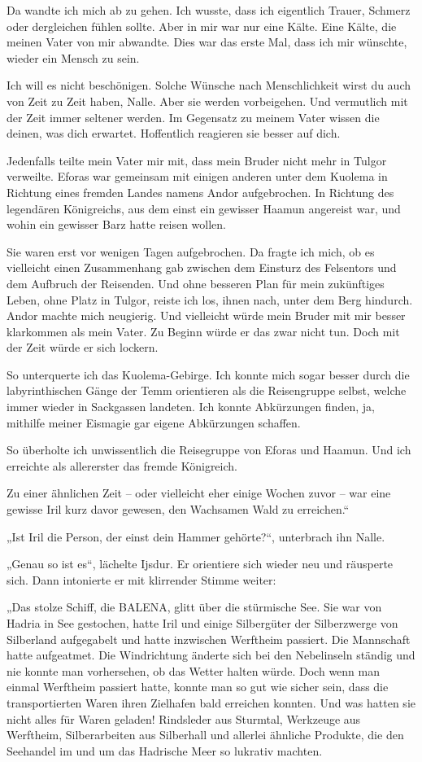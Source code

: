Da wandte ich mich ab zu gehen. Ich wusste, dass ich eigentlich Trauer, Schmerz oder dergleichen fühlen sollte. Aber in mir war nur eine Kälte. Eine Kälte, die meinen Vater von mir abwandte. Dies war das erste Mal, dass ich mir wünschte, wieder ein Mensch zu sein.

Ich will es nicht beschönigen. Solche Wünsche nach Menschlichkeit wirst du auch von Zeit zu Zeit haben, Nalle. Aber sie werden vorbeigehen. Und vermutlich mit der Zeit immer seltener werden. Im Gegensatz zu meinem Vater wissen die deinen, was dich erwartet. Hoffentlich reagieren sie besser auf dich.

Jedenfalls teilte mein Vater mir mit, dass mein Bruder nicht mehr in Tulgor verweilte. Eforas war gemeinsam mit einigen anderen unter dem Kuolema in Richtung eines fremden Landes namens Andor aufgebrochen. In Richtung des legendären Königreichs, aus dem einst ein gewisser Haamun angereist war, und wohin ein gewisser Barz hatte reisen wollen.

Sie waren erst vor wenigen Tagen aufgebrochen. Da fragte ich mich, ob es vielleicht einen Zusammenhang gab zwischen dem Einsturz des Felsentors und dem Aufbruch der Reisenden. Und ohne besseren Plan für mein zukünftiges Leben, ohne Platz in Tulgor, reiste ich los, ihnen nach, unter dem Berg hindurch. Andor machte mich neugierig. Und vielleicht würde mein Bruder mit mir besser klarkommen als mein Vater. Zu Beginn würde er das zwar nicht tun. Doch mit der Zeit würde er sich lockern.

So unterquerte ich das Kuolema-Gebirge. Ich konnte mich sogar besser durch die labyrinthischen Gänge der Temm orientieren als die Reisengruppe selbst, welche immer wieder in Sackgassen landeten. Ich konnte Abkürzungen finden, ja, mithilfe meiner Eismagie gar eigene Abkürzungen schaffen.

So überholte ich unwissentlich die Reisegruppe von Eforas und Haamun. Und ich erreichte als allererster das fremde Königreich.

Zu einer ähnlichen Zeit – oder vielleicht eher einige Wochen zuvor – war eine gewisse Iril kurz davor gewesen, den Wachsamen Wald zu erreichen.“

„Ist Iril die Person, der einst dein Hammer gehörte?“, unterbrach ihn Nalle.

„Genau so ist es“, lächelte Ijsdur. Er orientiere sich wieder neu und räusperte sich. Dann intonierte er mit klirrender Stimme weiter:

„Das stolze Schiff, die BALENA, glitt über die stürmische See. Sie war von Hadria in See gestochen, hatte Iril und einige Silbergüter der Silberzwerge von Silberland aufgegabelt und hatte inzwischen Werftheim passiert. Die Mannschaft hatte aufgeatmet. Die Windrichtung änderte sich bei den Nebelinseln ständig und nie konnte man vorhersehen, ob das Wetter halten würde. Doch wenn man einmal Werftheim passiert hatte, konnte man so gut wie sicher sein, dass die transportierten Waren ihren Zielhafen bald erreichen konnten. Und was hatten sie nicht alles für Waren geladen! Rindsleder aus Sturmtal, Werkzeuge aus Werftheim, Silberarbeiten aus Silberhall und allerlei ähnliche Produkte, die den Seehandel im und um das Hadrische Meer so lukrativ machten.

